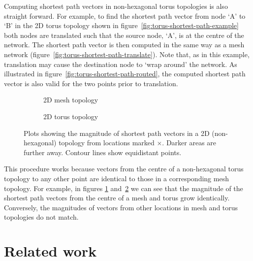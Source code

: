 			Computing shortest path vectors in non-hexagonal torus topologies is also
			straight forward. For example, to find the shortest path vector from node
			`A' to `B' in the 2D torus topology shown in figure~\ref{fig:torus-shortest-path-example} both nodes are translated such that
			the source node, `A', is at the centre of the network. The shortest path
			vector is then computed in the same way as a mesh network (figure~\ref{fig:torus-shortest-path-translate}). Note that, as in this example,
			translation may cause the destination node to `wrap around' the network.
			As illustrated in figure~\ref{fig:torus-shortest-path-routed}, the
			computed shortest path vector is also valid for the two points prior to
			translation.
			
			\begin{figure}
				\center
				
				\begin{subfigure}{\linewidth}
					\center
					\caption{2D mesh topology}
					\label{fig:distance-map-mesh}
				\end{subfigure}
				
				\vspace{1em}
				
				\begin{subfigure}{\linewidth}
					\center
					\caption{2D torus topology}
					\label{fig:distance-map-torus}
				\end{subfigure}
				
				\caption[Magnitudes of shortest path vectors in a 2D mesh.]%
				{Plots showing the magnitude of shortest path vectors in a 2D
				(non-hexagonal) topology from locations marked {\color{red}$\times$}.
				Darker areas are further away. Contour lines show equidistant points.}
				
				\label{fig:distance-map}
			\end{figure}
			
			This procedure works because vectors from the centre of a non-hexagonal
			torus topology to any other point are identical to those in a
			corresponding mesh topology. For example, in figures
			\ref{fig:distance-map-mesh} and~\ref{fig:distance-map-torus} we can see
			that the magnitude of the shortest path vectors from the centre of a mesh
			and torus grow identically. Conversely, the magnitudes of vectors from
			other locations in mesh and torus topologies do not match.
		
	\section{Related work}
		
